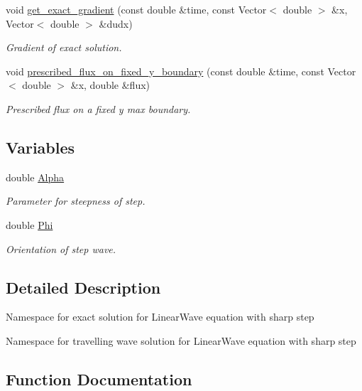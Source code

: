 \begin{DoxyCompactItemize}
void \hyperlink{namespaceTanhSolnForLinearWave_af4c104781fc753f17614bcd8ac4fddc8}{get\+\_\+exact\+\_\+gradient} (const double \&time, const Vector$<$ double $>$ \&x, Vector$<$ double $>$ \&dudx)
\begin{DoxyCompactList}\small\item\em Gradient of exact solution. \end{DoxyCompactList}\item 
void \hyperlink{namespaceTanhSolnForLinearWave_a5a56ef7a715cb0b6e709f928d0f10592}{prescribed\+\_\+flux\+\_\+on\+\_\+fixed\+\_\+y\+\_\+boundary} (const double \&time, const Vector$<$ double $>$ \&x, double \&flux)
\begin{DoxyCompactList}\small\item\em Prescribed flux on a fixed y max boundary. \end{DoxyCompactList}\end{DoxyCompactItemize}
\subsection*{Variables}
\begin{DoxyCompactItemize}
\item 
double \hyperlink{namespaceTanhSolnForLinearWave_a48021142056bdea20e6432e360fd0314}{Alpha}
\begin{DoxyCompactList}\small\item\em Parameter for steepness of step. \end{DoxyCompactList}\item 
double \hyperlink{namespaceTanhSolnForLinearWave_a5242d421b567b803323bc127081351a6}{Phi}
\begin{DoxyCompactList}\small\item\em Orientation of step wave. \end{DoxyCompactList}\end{DoxyCompactItemize}


\subsection{Detailed Description}
Namespace for exact solution for Linear\+Wave equation with sharp step

Namespace for travelling wave solution for Linear\+Wave equation with sharp step 

\subsection{Function Documentation}
\mbox{\label{namespaceTanhSolnForLinearWave_a63b7a0f5fd5d06cc2c0a43322a81fe43}} 
